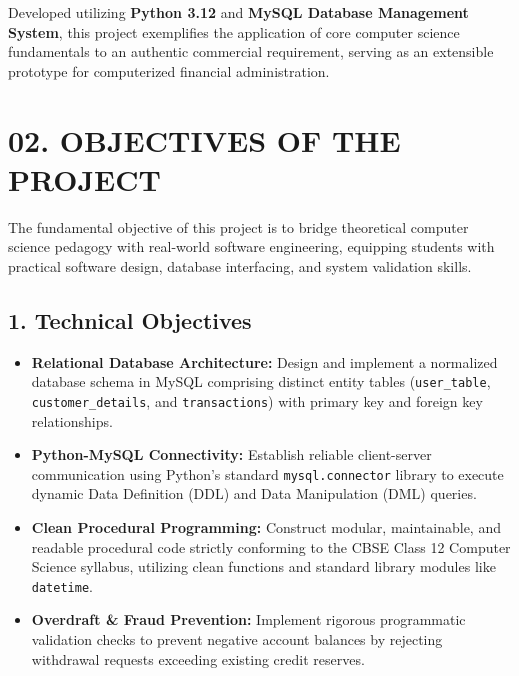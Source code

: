 \documentclass[12pt,a4paper]{article}
\begin{document}
\vspace{0.4em}
Developed utilizing \textbf{Python 3.12} and \textbf{MySQL Database Management System}, this project exemplifies the application of core computer science fundamentals to an authentic commercial requirement, serving as an extensible prototype for computerized financial administration.

\clearpage

\hypertarget{sec:objectives}{}\label{sec:objectives}
\enlargethispage{\baselineskip}
\section*{02. OBJECTIVES OF THE PROJECT}
\vspace{0.5em}

The fundamental objective of this project is to bridge theoretical computer science pedagogy with real-world software engineering, equipping students with practical software design, database interfacing, and system validation skills.

\vspace{0.4em}
\subsection*{1. Technical Objectives}
\begin{itemize}
    \item \textbf{Relational Database Architecture:} Design and implement a normalized database schema in MySQL comprising distinct entity tables (\texttt{user\_table}, \texttt{customer\_details}, and \texttt{transactions}) with primary key and foreign key relationships.
    \item \textbf{Python-MySQL Connectivity:} Establish reliable client-server communication using Python's standard \texttt{mysql.connector} library to execute dynamic Data Definition (DDL) and Data Manipulation (DML) queries.
    \item \textbf{Clean Procedural Programming:} Construct modular, maintainable, and readable procedural code strictly conforming to the CBSE Class 12 Computer Science syllabus, utilizing clean functions and standard library modules like \texttt{datetime}.
    \item \textbf{Overdraft \& Fraud Prevention:} Implement rigorous programmatic validation checks to prevent negative account balances by rejecting withdrawal requests exceeding existing credit reserves.
\end{itemize}
\end{document}
